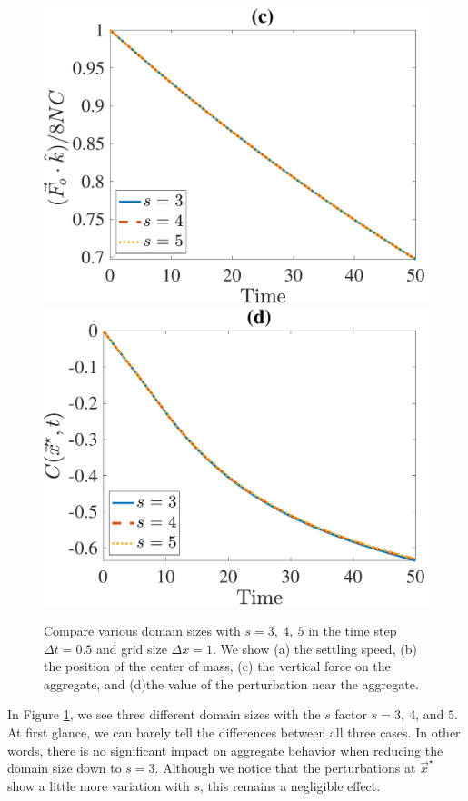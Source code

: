 \begin{figure}[ht]
\begin{center}
		\includegraphics[scale=0.35]{./figures/fig_NC10_s_Fo3_all}
		\includegraphics[scale=0.35]{./figures/fig_NC10_s_C_star}
	\caption{Compare various domain sizes with $ s = 3, \ 4, \ 5$ in the time step  $\Delta t = 0.5$ and grid size $\Delta x = 1$. We show (a) the settling speed, (b) the position of the center of mass, (c) the vertical force on the aggregate, and (d)the value of the perturbation near the aggregate.}
	\label{fig_NC10_compare_s}
\end{center}
\end{figure}
\par
In Figure \ref{fig_NC10_compare_s}, we see three different domain sizes with the $s$ factor $s = 3, \ 4$, and $5$. At first glance, we can barely tell the differences between all three cases. In other words, there is no significant impact on aggregate behavior when reducing the domain size down to $s = 3$. Although we notice that the perturbations at $\vec{x}^{\star}$ show a little more variation with $s$, this remains a negligible effect.

